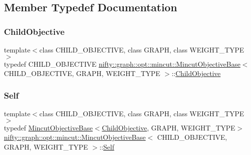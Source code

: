 \subsection{Member Typedef Documentation}
\mbox{\label{classnifty_1_1graph_1_1opt_1_1mincut_1_1MincutObjectiveBase_a0a0611141f24bfbf07488bea9e216ecd}} 
\subsubsection{\texorpdfstring{Child\+Objective}{ChildObjective}}
{\footnotesize\ttfamily template$<$class C\+H\+I\+L\+D\+\_\+\+O\+B\+J\+E\+C\+T\+I\+VE, class G\+R\+A\+PH, class W\+E\+I\+G\+H\+T\+\_\+\+T\+Y\+PE$>$ \\
typedef C\+H\+I\+L\+D\+\_\+\+O\+B\+J\+E\+C\+T\+I\+VE \hyperlink{classnifty_1_1graph_1_1opt_1_1mincut_1_1MincutObjectiveBase}{nifty\+::graph\+::opt\+::mincut\+::\+Mincut\+Objective\+Base}$<$ C\+H\+I\+L\+D\+\_\+\+O\+B\+J\+E\+C\+T\+I\+VE, G\+R\+A\+PH, W\+E\+I\+G\+H\+T\+\_\+\+T\+Y\+PE $>$\+::\hyperlink{classnifty_1_1graph_1_1opt_1_1mincut_1_1MincutObjectiveBase_a0a0611141f24bfbf07488bea9e216ecd}{Child\+Objective}}

\mbox{\label{classnifty_1_1graph_1_1opt_1_1mincut_1_1MincutObjectiveBase_a4d4cc2b24623941303a0de70a0e47ec8}} 
\subsubsection{\texorpdfstring{Self}{Self}}
{\footnotesize\ttfamily template$<$class C\+H\+I\+L\+D\+\_\+\+O\+B\+J\+E\+C\+T\+I\+VE, class G\+R\+A\+PH, class W\+E\+I\+G\+H\+T\+\_\+\+T\+Y\+PE$>$ \\
typedef \hyperlink{classnifty_1_1graph_1_1opt_1_1mincut_1_1MincutObjectiveBase}{Mincut\+Objective\+Base}$<$\hyperlink{classnifty_1_1graph_1_1opt_1_1mincut_1_1MincutObjectiveBase_a0a0611141f24bfbf07488bea9e216ecd}{Child\+Objective}, G\+R\+A\+PH, W\+E\+I\+G\+H\+T\+\_\+\+T\+Y\+PE$>$ \hyperlink{classnifty_1_1graph_1_1opt_1_1mincut_1_1MincutObjectiveBase}{nifty\+::graph\+::opt\+::mincut\+::\+Mincut\+Objective\+Base}$<$ C\+H\+I\+L\+D\+\_\+\+O\+B\+J\+E\+C\+T\+I\+VE, G\+R\+A\+PH, W\+E\+I\+G\+H\+T\+\_\+\+T\+Y\+PE $>$\+::\hyperlink{classnifty_1_1graph_1_1opt_1_1mincut_1_1MincutObjectiveBase_a4d4cc2b24623941303a0de70a0e47ec8}{Self}}



